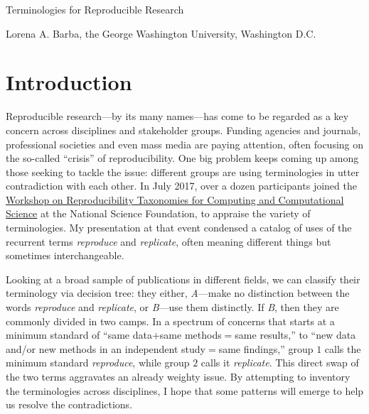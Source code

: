 \documentclass{statement}
\newlength{\up}
\begin{document}

\renewcommand{\thepage} {\arabic{page}}

\thispagestyle{empty}

{\titfont \Huge Terminologies for Reproducible Research} 
\medskip

{ Lorena A. Barba, the George Washington University, Washington D.C.}

\vspace{1cm}

\section*{Introduction}
\vspace{\up}

Reproducible research---by its many names---has come to be regarded as a key concern across disciplines and stakeholder groups. Funding agencies and journals, professional societies and even mass media are paying attention, often focusing on the so-called ``crisis'' of reproducibility. One big problem keeps coming up among those seeking to tackle the issue: different groups are using terminologies in utter contradiction with each other. 
In July 2017, over a dozen participants joined the \href{https://collegeville.github.io/repeto/ReproducibilityWorkshop2017.html}{Workshop on Reproducibility Taxonomies for Computing and Computational Science} at the National Science Foundation, to appraise the variety of terminologies.
My presentation at that event \cite[]{barba2017-repeto} condensed a catalog of uses of the recurrent terms \emph{reproduce} and \emph{replicate}, often meaning different things but sometimes interchangeable.

Looking at a broad sample of publications in different fields, we can classify their terminology via decision tree: they either, \emph{A}---make no distinction between the words \emph{reproduce} and \emph{replicate}, or \emph{B}---use them distinctly.  
If \emph{B}, then they are commonly divided in two camps. 
In a spectrum of concerns that starts at a minimum standard of ``same data$+$same methods$=$same results,'' to ``new data and/or new methods in an independent study$=$same findings,'' group $1$ calls the minimum standard \emph{reproduce}, while group $2$ calls it \emph{replicate}.
This direct swap of the two terms aggravates an already weighty issue.
By attempting to inventory the terminologies across disciplines, I hope that some patterns will emerge to help us resolve the contradictions.
\end{document}
